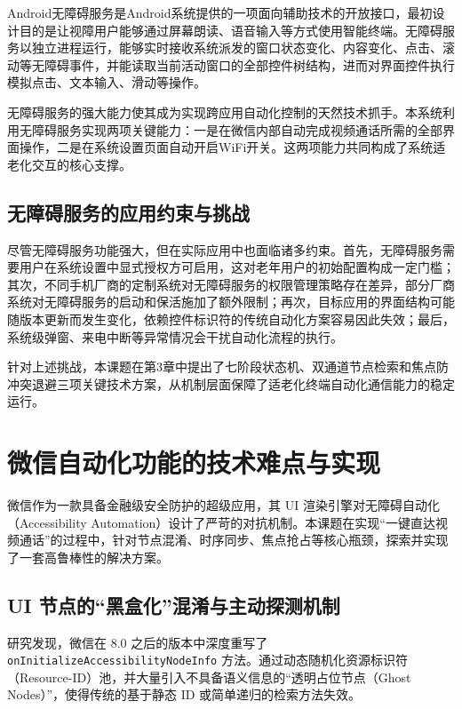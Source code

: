 Android无障碍服务是Android系统提供的一项面向辅助技术的开放接口，最初设计目的是让视障用户能够通过屏幕朗读、语音输入等方式使用智能终端。无障碍服务以独立进程运行，能够实时接收系统派发的窗口状态变化、内容变化、点击、滚动等无障碍事件，并能读取当前活动窗口的全部控件树结构，进而对界面控件执行模拟点击、文本输入、滑动等操作。

无障碍服务的强大能力使其成为实现跨应用自动化控制的天然技术抓手。本系统利用无障碍服务实现两项关键能力：一是在微信内部自动完成视频通话所需的全部界面操作，二是在系统设置页面自动开启WiFi开关。这两项能力共同构成了系统适老化交互的核心支撑。

\subsection{无障碍服务的应用约束与挑战}

尽管无障碍服务功能强大，但在实际应用中也面临诸多约束。首先，无障碍服务需要用户在系统设置中显式授权方可启用，这对老年用户的初始配置构成一定门槛；其次，不同手机厂商的定制系统对无障碍服务的权限管理策略存在差异，部分厂商系统对无障碍服务的启动和保活施加了额外限制；再次，目标应用的界面结构可能随版本更新而发生变化，依赖控件标识符的传统自动化方案容易因此失效；最后，系统级弹窗、来电中断等异常情况会干扰自动化流程的执行。

针对上述挑战，本课题在第3章中提出了七阶段状态机、双通道节点检索和焦点防冲突退避三项关键技术方案，从机制层面保障了适老化终端自动化通信能力的稳定运行。

\section{微信自动化功能的技术难点与实现}

微信作为一款具备金融级安全防护的超级应用，其 UI 渲染引擎对无障碍自动化（Accessibility Automation）设计了严苛的对抗机制。本课题在实现“一键直达视频通话”的过程中，针对节点混淆、时序同步、焦点抢占等核心瓶颈，探索并实现了一套高鲁棒性的解决方案。

\subsection{UI 节点的“黑盒化”混淆与主动探测机制}

研究发现，微信在 8.0 之后的版本中深度重写了 \texttt{onInitialize\allowbreak Accessibility\allowbreak NodeInfo} 方法。通过动态随机化资源标识符（Resource-ID）池，并大量引入不具备语义信息的“透明占位节点（Ghost Nodes）”，使得传统的基于静态 ID 或简单递归的检索方法失效。

